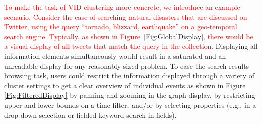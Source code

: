 

\textcolor{red}{ To make the task of VID clustering more concrete, we introduce an  example scenario.
Consider the case of searching natural disasters that are discussed on Twitter, using the query ``tornado, blizzard, earthquake'' on a geo-temporal search engine. Typically, as shown in Figure~\ref{Fig:GlobalDisplay}, there would be a visual display of all tweets that match the query in the collection.}
Displaying all information elements simultaneously
would result in a saturated and an unreadable display for any reasonably sized 
 problem. To ease the search results browsing task, users could restrict the information displayed
through a variety of cluster settings to get a clear overview of individual events as shown in Figure \ref{Fig:FilteredDisplay} \textendash{} by panning and
zooming in the graph display, by restricting upper and lower bounds
on a time filter, and/or by selecting properties (e.g., in a drop-down
selection or fielded keyword search in fields).%

